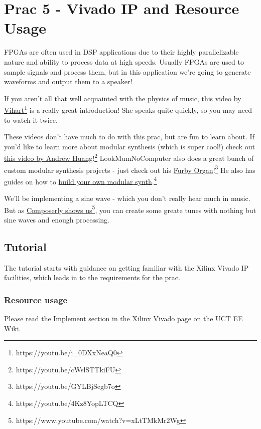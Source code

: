 \section{Prac 5 - Vivado IP and Resource Usage}
\label{sec:Prac5}
FPGAs are often used in DSP applications due to their highly parallelizable nature and ability to process data at high speeds. Usually FPGAs are used to sample signals and process them, but in this application we're going to generate waveforms and output them to a speaker!

If you aren't all that well acquainted with the physics of music, \href{https://www.youtube.com/watch?v=i_0DXxNeaQ0}{this video by Vihart}\footnote{https://youtu.be/i\_0DXxNeaQ0} is a really great introduction! She speaks quite quickly, so you may need to watch it twice.

These videos don't have much to do with this prac, but are fun to learn about. If you'd like to learn more about modular synthesis (which is super cool!) check out \href{https://www.youtube.com/watch?v=cWslSTTkiFU}{this video by Andrew Huang}!\footnote{https://youtu.be/cWslSTTkiFU} LookMumNoComputer also does a great bunch of custom modular synthesis projects - just check out his \href{https://youtu.be/GYLBjScgb7o}{Furby Organ}!\footnote{https://youtu.be/GYLBjScgb7o} He also has guides on how to \href{https://www.youtube.com/watch?v=4Kz8YopLTCQ&list=PLluPQLh1xzlIzqgTBwTo_a5k_O63JxwjQ}{build your own modular synth}.\footnote{https://youtu.be/4Kz8YopLTCQ}

We'll be implementing a sine wave - which you don't really hear much in music. But as \href{https://www.youtube.com/watch?v=xLtTMkMr2Wg}{Composerly shows us}\footnote{https://www.youtube.com/watch?v=xLtTMkMr2Wg}, you can create some greate tunes with nothing but sine waves and enough processing.

\subsection{Tutorial}
The tutorial starts with guidance on getting familiar with the Xilinx Vivado IP facilities, which leads in to the requirements for the prac. 

\subsubsection{Resource usage}
Please read the \href{http://wiki.ee.uct.ac.za/Xilinx_Vivado#Implement}{Implement section} in the Xilinx Vivado page on the UCT EE Wiki.

